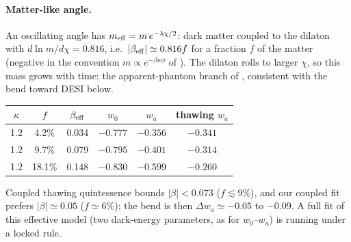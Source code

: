 \documentclass[11pt]{article}
\begin{document}
\paragraph{Matter-like angle.} An oscillating angle has $m_{\rm eff}=m\,e^{-\lambda\chi/2}$: dark matter coupled to the
dilaton with $d\ln m/d\chi=0.816$, i.e.\ $|\beta_{\rm eff}|\simeq0.816f$ for a fraction $f$ of the matter (negative in the convention
$m\propto e^{-\beta\kappa\phi}$ of \cite{babu2026}). The dilaton rolls to larger $\chi$, so this mass
grows with time: the apparent-phantom branch of \cite{babu2026}, consistent with the bend toward DESI below.
\begin{center}\small
\begin{tabular}{cccccc}
\toprule
$\kappa$ & $f$ & $\beta_{\rm eff}$ & $w_0$ & $w_a$ & thawing $w_a$ \\
\midrule
1.2 & 4.2\% & 0.034 & $-0.777$ & $-0.356$ & $-0.341$\\
1.2 & 9.7\% & 0.079 & $-0.795$ & $-0.401$ & $-0.314$\\
1.2 & 18.1\% & 0.148 & $-0.830$ & $-0.599$ & $-0.260$\\
\bottomrule
\end{tabular}
\end{center}
Coupled thawing quintessence bounds $|\beta|<0.073$ \cite{babu2026} ($f\lesssim9\%$), and our coupled fit prefers
$|\beta|\simeq0.05$ ($f\simeq6\%$); the bend is then $\Delta w_a\simeq-0.05$ to $-0.09$. A full fit of this effective
model (two dark-energy parameters, as for $w_0$--$w_a$) is running under a locked rule.
\end{document}
